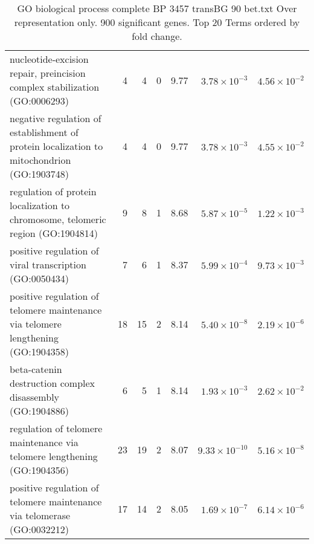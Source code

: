 \begin{table}[ht]
\begin{adjustbox}{width=\textwidth}
\begin{tabular}{lrrrlrr}
  nucleotide-excision repair, preincision complex stabilization (GO:0006293) & 4 & 4 & 0 & 9.77 & $3.78 \times 10^{-3}$ & $4.56 \times 10^{-2}$ \\ 
  negative regulation of establishment of protein localization to mitochondrion (GO:1903748) & 4 & 4 & 0 & 9.77 & $3.78 \times 10^{-3}$ & $4.55 \times 10^{-2}$ \\ 
  regulation of protein localization to chromosome, telomeric region (GO:1904814) & 9 & 8 & 1 & 8.68 & $5.87 \times 10^{-5}$ & $1.22 \times 10^{-3}$ \\ 
  positive regulation of viral transcription (GO:0050434) & 7 & 6 & 1 & 8.37 & $5.99 \times 10^{-4}$ & $9.73 \times 10^{-3}$ \\ 
  positive regulation of telomere maintenance via telomere lengthening (GO:1904358) & 18 & 15 & 2 & 8.14 & $5.40 \times 10^{-8}$ & $2.19 \times 10^{-6}$ \\ 
  beta-catenin destruction complex disassembly (GO:1904886) & 6 & 5 & 1 & 8.14 & $1.93 \times 10^{-3}$ & $2.62 \times 10^{-2}$ \\ 
  regulation of telomere maintenance via telomere lengthening (GO:1904356) & 23 & 19 & 2 & 8.07 & $9.33 \times 10^{-10}$ & $5.16 \times 10^{-8}$ \\ 
  positive regulation of telomere maintenance via telomerase (GO:0032212) & 17 & 14 & 2 & 8.05 & $1.69 \times 10^{-7}$ & $6.14 \times 10^{-6}$ \\ 
   \hline
\end{tabular}
\end{adjustbox}
\caption{GO biological process complete BP 3457 transBG 90 bet.txt Over representation only. 900 significant genes. Top 20 Terms ordered by fold change. } 
\label{tab:GO biological process complete BP 3457 transBG 90 bet.txt Over representation only. 900 significant genes. Top 20 Terms ordered by fold change. }
\end{table}


